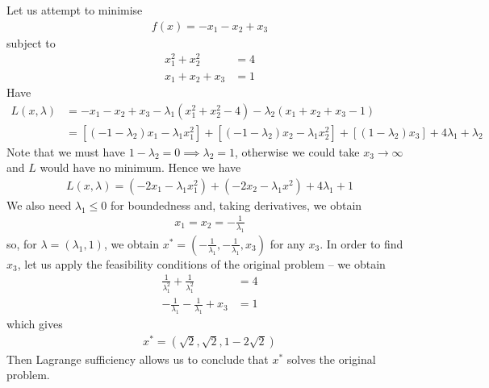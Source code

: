 \documentclass{../../template/note}
\begin{document}
    \begin{example*}
        Let us attempt to minimise
        \begin{align*}
            f(x) =-x_1-x_2+x_3
        \end{align*}
        subject to
        \begin{align*}
            x_1^2 + x_2^2 &= 4 \\
            x_1+x_2+x_3 &= 1
        \end{align*}
        Have
        \begin{align*}
            L(x, \lambda) &= -x_1-x_2+x_3 - \lambda_1(x_1^2+x_2^2-4)-\lambda_2(x_1+x_2+x_3-1) \\
            &= [(-1-\lambda_2)x_1 - \lambda_1x_1^2] + [(-1-\lambda_2)x_2-\lambda_1x_2^2] + [(1-\lambda_2)x_3] + 4\lambda_1 + \lambda_2
        \end{align*}
        Note that we must have $1-\lambda_2 = 0 \implies \lambda_2 = 1$, otherwise we could take $x_3 \to \infty$ and $L$ would have no minimum. Hence we have
        \begin{align*}
            L(x, \lambda) = (-2x_1-\lambda_1x_1^2) + (-2x_2-\lambda_1x^2) + 4\lambda_1+1
        \end{align*}
        We also need $\lambda_1 \leq 0$ for boundedness and, taking derivatives, we obtain
        \begin{align*}
            x_1 = x_2 = -\frac 1 {\lambda_1}
        \end{align*}
        so, for $\lambda = (\lambda_1, 1)$, we obtain $x^* = (-\frac 1 {\lambda_1}, -\frac 1{\lambda_1}, x_3)$ for any $x_3$. In order to find $x_3$, let us apply the feasibility conditions of the original problem -- we obtain
        \begin{align*}
            \frac 1 {\lambda_1^2} + \frac 1 {\lambda_1^2} &= 4 \\
            -\frac 1{\lambda_1} - \frac 1{\lambda_1} + x_3 &= 1
        \end{align*}
        which gives
        \begin{align*}
            x^* = (\sqrt 2, \sqrt 2, 1-2\sqrt 2)
        \end{align*}
        Then Lagrange sufficiency allows us to conclude that $x^*$ solves the original problem.       
    \end{example*}
    
\end{document}
